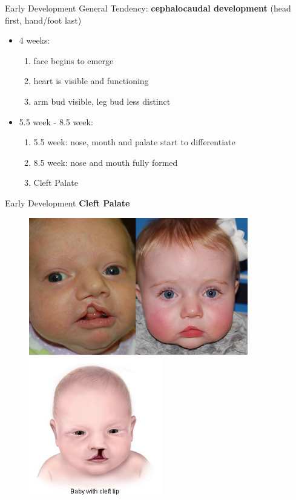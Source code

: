 \documentclass{beamer} %
\begin{document}
\begin{frame}{Early Development}
General Tendency: \textbf{cephalocaudal development} (head first, hand/foot last)
\begin{itemize}
    \item 4 weeks:
    \begin{enumerate}
        \item face begins to emerge
        \item heart is visible and functioning
        \item arm bud visible, leg bud less distinct
    \end{enumerate} 
    \pause
    \item 5.5 week - 8.5 week:
    \begin{enumerate}
        \item 5.5 week: nose, mouth and palate start to differentiate
        \item 8.5 week: nose and mouth fully formed
        \item Cleft Palate
    \end{enumerate}
\end{itemize}
\end{frame}
\begin{frame}{Early Development}
\textbf{Cleft Palate}
\begin{figure}
    \includegraphics[width=0.457\linewidth,height=6cm]{culley-before-after.jpg}
    \hfill
    \includegraphics[width=0.457\linewidth,height=6cm]{cleftlip_small.jpg}
\end{figure}
\end{frame}
\end{document}
